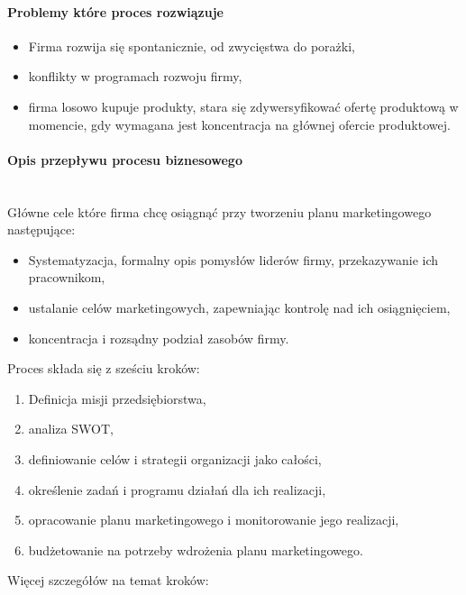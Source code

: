 \documentclass[a4paper, 12pt]{article}
\begin{document}
\paragraph{Problemy które proces rozwiązuje}
\begin{itemize}
	\item Firma rozwija się spontanicznie, od zwycięstwa do porażki,
	\item konflikty w programach rozwoju firmy,
	\item firma losowo kupuje produkty, stara się zdywersyfikować ofertę produktową w momencie, gdy wymagana jest koncentracja na głównej ofercie produktowej.
\end{itemize} 
\newpage
\paragraph{Opis przepływu procesu biznesowego}\mbox{}\\
\hspace*{1 cm} Główne cele które firma chcę osiągnąć przy tworzeniu planu marketingowego następujące:
\begin{itemize}
	\item Systematyzacja, formalny opis pomysłów liderów firmy, przekazywanie ich pracownikom,
	\item ustalanie celów marketingowych, zapewniając kontrolę nad ich osiągnięciem,
	\item koncentracja i rozsądny podział zasobów firmy.
\end{itemize} 
\hspace*{1 cm} Proces składa się z sześciu kroków:
\begin{enumerate}
	\item Definicja misji przedsiębiorstwa,
	\item analiza SWOT,
	\item definiowanie celów i strategii organizacji jako całości,
	\item określenie zadań i programu działań dla ich realizacji,
	\item opracowanie planu marketingowego i monitorowanie jego realizacji,
	\item budżetowanie na potrzeby wdrożenia planu marketingowego.
\end{enumerate}
Więcej szczegółów na temat kroków:
\end{document}
